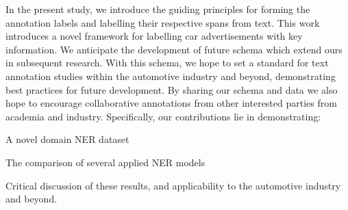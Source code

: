\documentclass[11pt]{article}
\begin{document}
In the present study, we introduce the guiding principles for forming the annotation labels and labelling their respective spans from text. This work introduces a novel framework for labelling car advertisements with key information. We anticipate the development of future schema which extend ours in subsequent research. With this schema, we hope to set a standard for text annotation studies within the automotive industry and beyond, demonstrating best practices for future development. By sharing our schema and data we also hope to encourage collaborative annotations from other interested parties from academia and industry. Specifically, our contributions lie in demonstrating:
\begin{enumerate*}
    \item A novel domain NER dataset
    \item The comparison of several applied NER models
    \item Critical discussion of these results, and applicability to the automotive industry and beyond.
\end{enumerate*}


\end{document}
